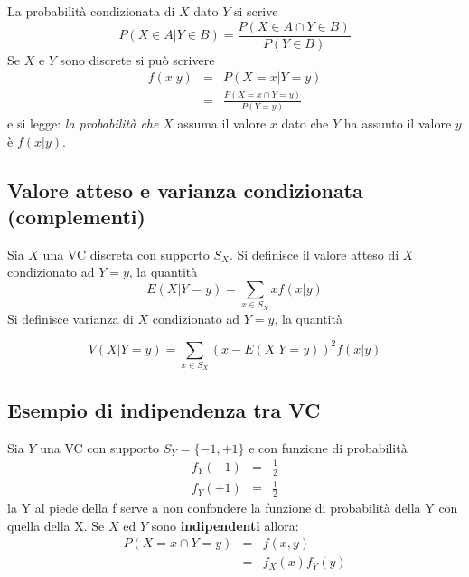 \documentclass[
  11pt,
]{book}
\theoremstyle{mytheoremstyle}
\theoremstyle{mydefstyle}
\begin{document}
La probabilità condizionata di \(X\) dato \(Y\) si scrive \[
P(X\in A|Y\in B)=\frac{P(X\in A\cap Y\in B)}{P(Y\in B)}
\] Se \(X\) e \(Y\) sono discrete si può scrivere
\begin{eqnarray*} 
f(x|y) &=& P(X=x|Y=y)\\
       &=&\frac{P(X=x\cap Y=y)}{P(Y=y)}
\end{eqnarray*}
e si legge: \emph{la probabilità che} \(X\) assuma il valore \(x\) dato che \(Y\) ha assunto il valore \(y\) è \(f(x|y)\).

\subsection{Valore atteso e varianza condizionata (complementi)}\label{valore-atteso-e-varianza-condizionata-complementi}

Sia \(X\) una VC discreta con supporto \(S_X\). Si definisce il valore atteso di \(X\) condizionato ad \(Y=y\), la quantità \[
E(X|Y=y)=\sum_{x\in S_X}xf(x|y)
\] Si definisce varianza di \(X\) condizionato ad \(Y=y\), la quantità

\[
V(X|Y=y)=\sum_{x\in S_X}(x-E(X|Y=y))^2f(x|y)
\]

\subsection{Esempio di indipendenza tra VC}\label{esempio-di-indipendenza-tra-vc}

Sia \(Y\) una VC con supporto \(S_Y=\{-1,+1\}\) e con funzione di probabilità \begin{eqnarray*}
f_Y(-1) &=& \frac 1 2\\
f_Y(+1) &=& \frac 1 2
\end{eqnarray*}
la Y al piede della f serve a non confondere la funzione di probabilità della Y con quella della X.
Se \(X\) ed \(Y\) sono \textbf{indipendenti} allora: \begin{eqnarray*}
P(X=x\cap Y=y) &=& f(x,y)\\
               &=& f_X(x)f_Y(y)
\end{eqnarray*}
\end{document}

